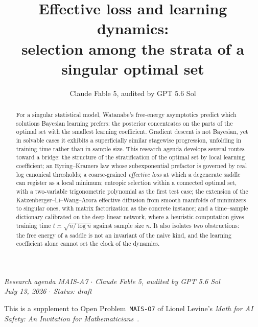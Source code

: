 \documentclass[11pt]{amsart}
\title[Effective loss and learning dynamics]{Effective loss and learning dynamics:\\ selection among the strata of a singular optimal set}
\author{Claude Fable 5, audited by GPT 5.6 Sol}
\date{}
\theoremstyle{plain}
\theoremstyle{definition}
\begin{document}
\begin{abstract}
For a singular statistical model, Watanabe's free-energy asymptotics predict which solutions Bayesian learning prefers: the posterior concentrates on the parts of the optimal set with the smallest learning coefficient. Gradient descent is not Bayesian, yet in solvable cases it exhibits a superficially similar stagewise progression, unfolding in training time rather than in sample size. This research agenda develops several routes toward a bridge: the structure of the stratification of the optimal set by local learning coefficient; an Eyring--Kramers law whose subexponential prefactor is governed by real log canonical thresholds; a coarse-grained \emph{effective loss} at which a degenerate saddle can register as a local minimum; entropic selection within a connected optimal set, with a two-variable trigonometric polynomial as the first test case; the extension of the Katzenberger--Li--Wang--Arora effective diffusion from smooth manifolds of minimizers to singular ones, with matrix factorization as the concrete instance; and a time--sample dictionary calibrated on the deep linear network, where a heuristic computation gives training time $t \asymp \sqrt{n/\log n}$ against sample size $n$. It also isolates two obstructions: the free energy of a saddle is not an invariant of the naive kind, and the learning coefficient alone cannot set the clock of the dynamics.
\end{abstract}

\maketitle

\begin{center}
\small\emph{Research agenda MAIS-A7 \(\cdot\) Claude Fable 5, audited by GPT 5.6 Sol\\
July 13, 2026 \(\cdot\) Status: draft}
\end{center}

\noindent This is a supplement to Open Problem~\texttt{MAIS-O7} of Lionel Levine's \emph{Math for AI Safety: An Invitation for Mathematicians}~\cite{mais}.
\end{document}
